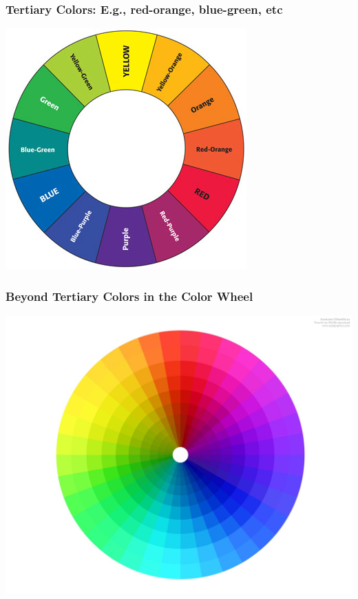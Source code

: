 \documentclass{beamer} %
\begin{document}
\begin{frame}\frametitle{Tertiary Colors:  E.g., red-orange, blue-green, etc}
	\centering
	
	\includegraphics[width=0.77\linewidth]{colorwheel2}
	
\end{frame}



\begin{frame}\frametitle{Beyond Tertiary Colors in the Color Wheel}
	\centering
	
	\includegraphics[width=0.87\linewidth]{colorwheel3}
	
\end{frame}
\end{document}
